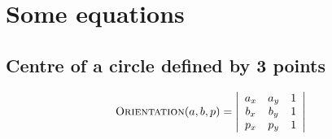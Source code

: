
\graphicspath{{appendices/equations/figs/}}

\chapter{Some equations}%
\label{app:equations}

%
\section{Centre of a circle defined by 3 points}%
\label{sec:centrecircle}



\begin{equation}
  \textrm{O}\textsc{rientation}(a, b, p) = 
  \left| 
  \begin{array}{cccc}
    a_{x} & a_{y} & 1 \\
    b_{x} & b_{y} & 1 \\
    p_{x} & p_{y} & 1 
  \end{array} 
  \right| 
\end{equation}
